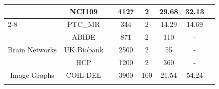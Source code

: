 \begin{table}[]
\begin{center}
{\begin{tabular}{lclccccl}
\multicolumn{1}{|c|}{}                                  & \multicolumn{1}{c|}{NCI109}           & \multicolumn{1}{c|}{}       & \multicolumn{1}{c|}{4127}           & \multicolumn{1}{c|}{2}               & \multicolumn{1}{c|}{29.68}                & \multicolumn{1}{c|}{32.13}                & \multicolumn{1}{c|}{}                            \\ \cline{2-8} 
\multicolumn{1}{|c|}{}                                  & \multicolumn{1}{c|}{PTC\_MR}          & \multicolumn{1}{c|}{}      & \multicolumn{1}{c|}{344}            & \multicolumn{1}{c|}{2}               & \multicolumn{1}{c|}{14.29}                & \multicolumn{1}{c|}{14.69}                & \multicolumn{1}{c|}{}                            \\ \hline
\multicolumn{1}{|c|}{\multirow{3}{*}{Brain Networks}}   & \multicolumn{1}{c|}{ABIDE}            & \multicolumn{1}{c|}{}                                                 & \multicolumn{1}{c|}{871}            & \multicolumn{1}{c|}{2}               & \multicolumn{1}{c|}{110}                  & \multicolumn{1}{c|}{-}                    & \multicolumn{1}{c|}{}                            \\ \cline{2-8} 
\multicolumn{1}{|l|}{}                                  & \multicolumn{1}{c|}{UK Biobank}       & \multicolumn{1}{c|}{}                                                 & \multicolumn{1}{c|}{2500}           & \multicolumn{1}{c|}{2}               & \multicolumn{1}{c|}{55}                   & \multicolumn{1}{c|}{-}                    & \multicolumn{1}{c|}{}                            \\ \cline{2-8} 
\multicolumn{1}{|l|}{}                                  & \multicolumn{1}{c|}{HCP}              & \multicolumn{1}{c|}{}                                                 & \multicolumn{1}{c|}{1200}            & \multicolumn{1}{c|}{2}               & \multicolumn{1}{c|}{360}                  & \multicolumn{1}{c|}{-}                    & \multicolumn{1}{c|}{}                            \\ \hline
\multicolumn{1}{|c|}{Image Graphs}                      & \multicolumn{1}{c|}{COIL-DEL}         & \multicolumn{1}{c|}{}                                                 & \multicolumn{1}{c|}{3900}           & \multicolumn{1}{c|}{100}             & \multicolumn{1}{c|}{21.54}                & \multicolumn{1}{c|}{54.24}                & \multicolumn{1}{c|}{}                            \\ \hline
                                                        & \multicolumn{1}{l}{}                  &                                                                       & \multicolumn{1}{l}{}                & \multicolumn{1}{l}{}                 & \multicolumn{1}{l}{}                      & \multicolumn{1}{l}{}                      &                                                 
\end{tabular}
}
\end{center}
\end{table}

